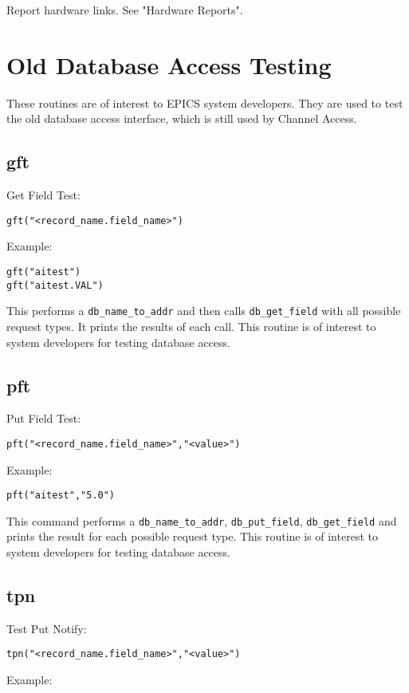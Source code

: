 Report hardware links. See "Hardware Reports".

\section{Old Database Access Testing}

These routines are of interest to EPICS system developers. They are used to test the old database access interface, which 
is still used by Channel Access.

\subsection{gft}

Get Field Test:

\begin{verbatim}gft("<record_name.field_name>")
\end{verbatim}Example:

\begin{verbatim}gft("aitest")
gft("aitest.VAL")
\end{verbatim}This performs a \verb|db_name_to_addr| and then calls \verb|db_get_field| with all possible request types. It prints the results 
of each call. This routine is of interest to system developers for testing database access.

\subsection{pft}

Put Field Test:

\begin{verbatim}pft("<record_name.field_name>","<value>")
\end{verbatim}Example:

\begin{verbatim}pft("aitest","5.0")
\end{verbatim}This command performs a \verb|db_name_to_addr|, \verb|db_put_field|, \verb|db_get_field| and prints the result for each 
possible request type. This routine is of interest to system developers for testing database access.

\subsection{tpn}

Test Put Notify:

\begin{verbatim}tpn("<record_name.field_name>","<value>")
\end{verbatim}Example:

